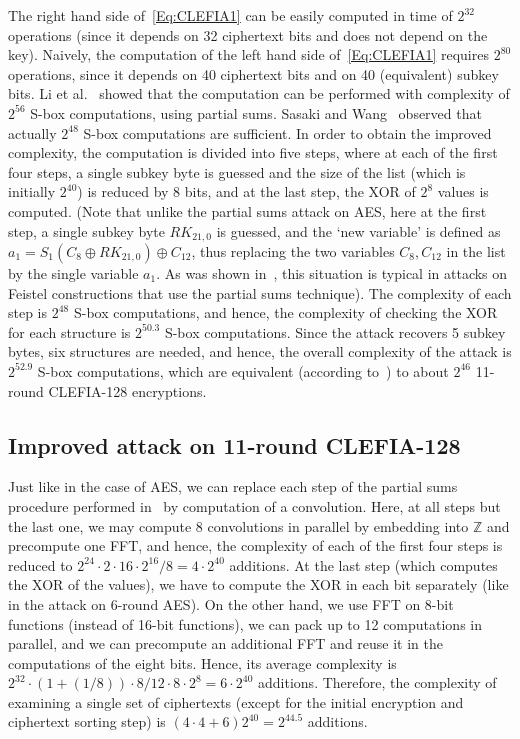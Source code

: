 The right hand side of~\eqref{Eq:CLEFIA1} can be easily computed in time of $2^{32}$ operations (since it depends on 32 ciphertext bits and does not depend on the key). Naively, the computation of the left hand side of~\eqref{Eq:CLEFIA1} requires $2^{80}$ operations, since it depends on 40 ciphertext bits and on 40 (equivalent) subkey bits. Li et al.~\cite{WISA:LiWuZha11} showed that the computation can be performed with complexity of $2^{56}$ S-box computations, using partial sums. Sasaki and Wang~\cite{SAC:SasWan12} observed that actually $2^{48}$ S-box computations are sufficient. In order to obtain the improved complexity, the computation is divided into five steps, where at each of the first four steps, a single subkey byte is guessed and the size of the list (which is initially $2^{40}$) is reduced by 8 bits, and at the last step, the XOR of $2^{8}$ values is computed. (Note that unlike the partial sums attack on AES, here at the first step, a single subkey byte $RK_{21,0}$ is guessed, and the `new variable' is defined as $a_1=S_1(C_8 \oplus RK_{21,0})\oplus C_{12}$, thus replacing the two variables $C_8,C_{12}$ in the list by the single variable $a_1$. As was shown in~\cite{SAC:SasWan12}, this situation is typical in attacks on Feistel constructions that use the partial sums technique). The complexity of each step is $2^{48}$ S-box computations, and hence, the complexity of checking the XOR for each structure is $2^{50.3}$ S-box computations. Since the attack recovers 5 subkey bytes, six structures are needed, and hence, the overall complexity of the attack is $2^{52.9}$ S-box computations, which are equivalent (according to~\cite{SAC:SasWan12}) to about $2^{46}$ 11-round CLEFIA-128 encryptions. 

\subsection{Improved attack on 11-round CLEFIA-128}

Just like in the case of AES, we can replace each step of the partial sums procedure performed in~\cite{SAC:SasWan12} by computation of a convolution. Here, at all steps but the last one, we may compute 8 convolutions in parallel by embedding into $\mathbb{Z}$ and precompute one FFT, and hence, the complexity of each of the first four steps is reduced to $2^{24} \cdot 2 \cdot 16 \cdot 2^{16}/8=4 \cdot 2^{40}$ additions. At the last step (which computes the XOR of the values), we have to compute the XOR in each bit separately (like in the attack on 6-round AES). On the other hand, we use FFT on 8-bit functions (instead of 16-bit functions), we can pack up to 12 computations in parallel, and we can precompute an additional FFT and reuse it in the computations of the eight bits. Hence, its average complexity is $2^{32} \cdot (1+(1/8)) \cdot 8/12 \cdot 8 \cdot 2^{8}=6 \cdot 2^{40}$ additions. Therefore, the complexity of examining a single set of ciphertexts (except for the initial encryption and ciphertext sorting step) is $(4\cdot 4+6)2^{40}= 2^{44.5}$ additions.

